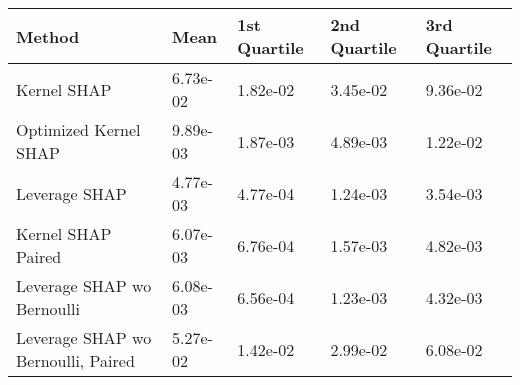 \begin{tabular}{lllll}
  \toprule
  \textbf{Method} & \textbf{Mean} & \textbf{1st Quartile} & \textbf{2nd Quartile} & \textbf{3rd Quartile} \\ \midrule 
Kernel SHAP & 6.73e-02 & 1.82e-02 & 3.45e-02 & 9.36e-02\\
Optimized Kernel SHAP & 9.89e-03 & 1.87e-03 & 4.89e-03 & 1.22e-02\\
Leverage SHAP & \cellcolor{gold!60}4.77e-03 & \cellcolor{gold!60}4.77e-04 & \cellcolor{silver!60}1.24e-03 & \cellcolor{gold!60}3.54e-03\\
Kernel SHAP Paired & \cellcolor{silver!60}6.07e-03 & \cellcolor{bronze!60}6.76e-04 & \cellcolor{bronze!60}1.57e-03 & \cellcolor{bronze!60}4.82e-03\\
Leverage SHAP wo Bernoulli & \cellcolor{bronze!60}6.08e-03 & \cellcolor{silver!60}6.56e-04 & \cellcolor{gold!60}1.23e-03 & \cellcolor{silver!60}4.32e-03\\
Leverage SHAP wo Bernoulli, Paired & 5.27e-02 & 1.42e-02 & 2.99e-02 & 6.08e-02\\
\bottomrule
\end{tabular}